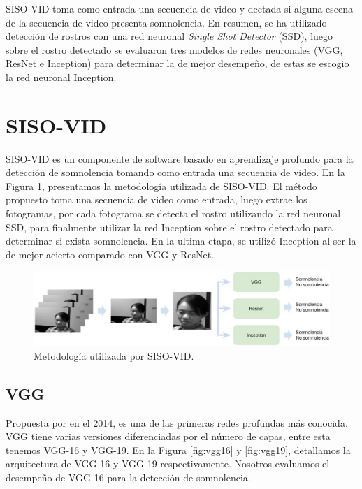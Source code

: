 \documentclass{article}
\begin{document}
	SISO-VID toma como entrada una secuencia de video y dectada si alguna escena de la secuencia de video presenta somnolencia. En resumen, se ha utilizado detección de rostros con una red neuronal \textit{Single Shot Detector} (SSD), luego sobre el rostro detectado se evaluaron tres modelos de redes neuronales (VGG, ResNet e Inception) para determinar la de mejor desempeño, de estas se escogio la red neuronal Inception. 
	
	
	
	\section{SISO-VID} \label{desarrollo}
	
	SISO-VID es un componente de software basado en aprendizaje profundo para la detección de somnolencia tomando como entrada una secuencia de video. En la Figura \ref{fig:siso_vid}, presentamos la metodología utilizada de SISO-VID. El método propuesto toma una secuencia de video como entrada, luego extrae los fotogramas, por cada fotograma se detecta el rostro utilizando la red neuronal SSD, para finalmente utilizar la red Inception sobre el rostro detectado para determinar si exista somnolencia. En la ultima etapa, se utilizó Inception al ser la de mejor acierto comparado con VGG y ResNet.\\
	
	\begin{figure}[H]
		\includegraphics[width=\textwidth]{img/siso_vid}		
		\caption{Metodología utilizada por SISO-VID.}
		\label{fig:siso_vid}
	\end{figure}

	
	\subsection{VGG}
	
	Propuesta por \cite{simonyan2014very} en el 2014, es una de las primeras redes profundas más conocida. VGG tiene varias versiones diferenciadas por el número de capas, entre esta tenemos VGG-16 y VGG-19. En la Figura \ref{fig:vgg16} y \ref{fig:vgg19}, detallamos la arquitectura de VGG-16 y VGG-19 respectivamente. Nosotros evaluamos el desempeño de VGG-16 para la detección de somnolencia.
	
\end{document}
